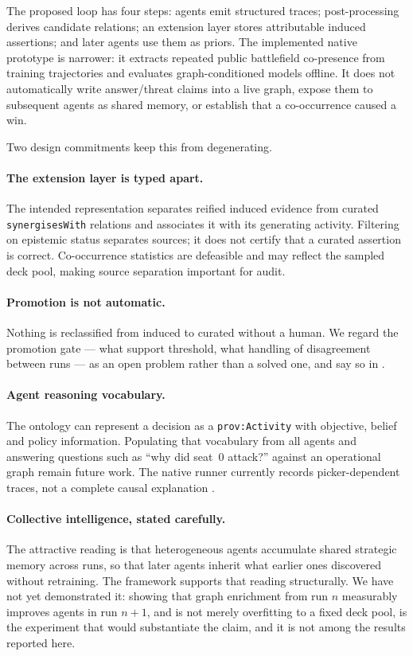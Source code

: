 \documentclass[11pt,a4paper]{article}
\theoremstyle{definition}
\theoremstyle{plain}
\begin{document}
The proposed loop has four steps: agents emit structured traces; post-processing derives candidate relations; an extension layer stores attributable induced assertions; and later agents use them as priors. The implemented native prototype is narrower: it extracts repeated public battlefield co-presence from training trajectories and evaluates graph-conditioned models offline. It does not automatically write answer/threat claims into a live graph, expose them to subsequent agents as shared memory, or establish that a co-occurrence caused a win.

Two design commitments keep this from degenerating.

\paragraph{The extension layer is typed apart.} The intended representation separates reified induced evidence from curated \texttt{synergisesWith} relations and associates it with its generating activity. Filtering on epistemic status separates sources; it does not certify that a curated assertion is correct. Co-occurrence statistics are defeasible and may reflect the sampled deck pool, making source separation important for audit.

\paragraph{Promotion is not automatic.} Nothing is reclassified from induced to curated without a human. We regard the promotion gate --- what support threshold, what handling of disagreement between runs \citep{ehrenmuller2026sock} --- as an open problem rather than a solved one, and say so in .

\paragraph{Agent reasoning vocabulary.} The ontology can represent a decision as a \texttt{prov:Activity} with objective, belief and policy information. Populating that vocabulary from all agents and answering questions such as ``why did seat~0 attack?'' against an operational graph remain future work. The native runner currently records picker-dependent traces, not a complete causal explanation \citep{sabou2026neurosymbolic}.

\paragraph{Collective intelligence, stated carefully.} The attractive reading is that heterogeneous agents accumulate shared strategic memory across runs, so that later agents inherit what earlier ones discovered without retraining. The framework supports that reading structurally. We have not yet demonstrated it: showing that graph enrichment from run $n$ measurably improves agents in run $n{+}1$, and is not merely overfitting to a fixed deck pool, is the experiment that would substantiate the claim, and it is not among the results reported here.
\end{document}
